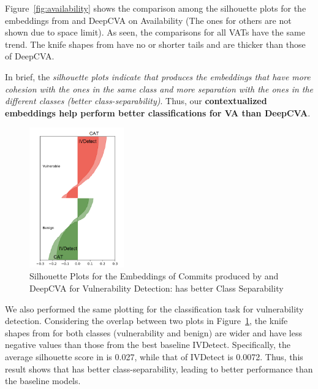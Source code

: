 
Figure~\ref{fig:availability} shows the comparison among the
silhouette plots for the embeddings from {\tool} and DeepCVA on
Availability (The ones for others are not shown due to space limit).
As seen, the comparisons for all VATs have the same trend. The knife
shapes from {\tool} have no or shorter tails and are thicker than
those of DeepCVA.

In brief, the {\em silhouette plots indicate that {\tool} produces the
embeddings that have more cohesion with the ones in the same class and
more separation with the ones in the different classes (better
class-separability)}. Thus, our {\bf contextualized embeddings help
{\tool} perform better classifications for VA than DeepCVA}.



\begin{figure}[t]
	\centering
	\includegraphics[width=1.6in]{graphs/plot-vd}
       \vspace{-6pt}
	\caption{Silhouette Plots for the Embeddings of Commits produced by {\tool} and DeepCVA for Vulnerability Detection: {\tool} has better Class Separability}
	\label{fig:vd}
\end{figure}

We also performed the same plotting for the classification task for
vulnerability detection. Considering the overlap between two plots in
Figure~\ref{fig:vd}, the knife shapes from {\tool} for both classes
(vulnerability and benign) are wider and have less negative values
than those from the best baseline IVDetect. Specifically, the average
silhouette score in {\tool} is 0.027, while that of IVDetect is
0.0072. Thus, this result shows that {\tool} has better
class-separability, leading to better performance than the baseline
models.
